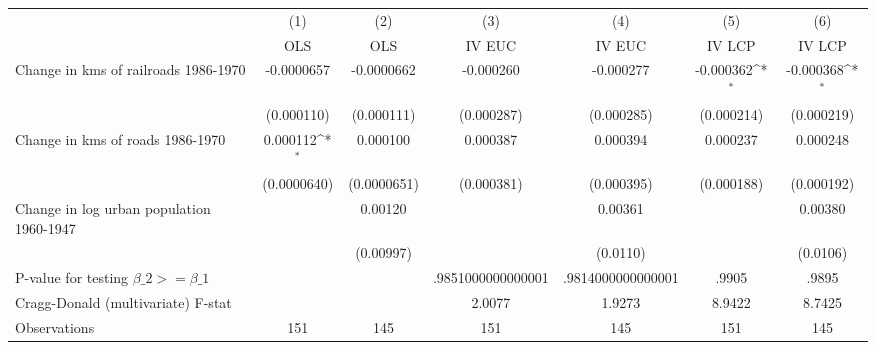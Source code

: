 {
\def\sym#1{\ifmmode^{#1}\else\(^{#1}\)\fi}
\begin{tabular}{l*{6}{c}}
\hline\hline
                &\multicolumn{1}{c}{(1)}&\multicolumn{1}{c}{(2)}&\multicolumn{1}{c}{(3)}&\multicolumn{1}{c}{(4)}&\multicolumn{1}{c}{(5)}&\multicolumn{1}{c}{(6)}\\
                &\multicolumn{1}{c}{OLS}&\multicolumn{1}{c}{OLS}&\multicolumn{1}{c}{IV EUC}&\multicolumn{1}{c}{IV EUC}&\multicolumn{1}{c}{IV LCP}&\multicolumn{1}{c}{IV LCP}\\
\hline
Change in kms of railroads 1986-1970&-0.0000657         &-0.0000662         &-0.000260         &-0.000277         &-0.000362\sym{*}  &-0.000368\sym{*}  \\
                &(0.000110)         &(0.000111)         &(0.000287)         &(0.000285)         &(0.000214)         &(0.000219)         \\
[1em]
Change in kms of roads 1986-1970& 0.000112\sym{*}  & 0.000100         & 0.000387         & 0.000394         & 0.000237         & 0.000248         \\
                &(0.0000640)         &(0.0000651)         &(0.000381)         &(0.000395)         &(0.000188)         &(0.000192)         \\
[1em]
Change in log urban population 1960-1947&                  &  0.00120         &                  &  0.00361         &                  &  0.00380         \\
                &                  &(0.00997)         &                  & (0.0110)         &                  & (0.0106)         \\
\hline
P-value for testing $\beta\_{2} >= \beta\_{1}$&                  &                  &.9851000000000001         &.9814000000000001         &    .9905         &    .9895         \\
Cragg-Donald (multivariate) F-stat&                  &                  &   2.0077         &   1.9273         &   8.9422         &   8.7425         \\
Observations    &      151         &      145         &      151         &      145         &      151         &      145         \\
\hline\hline
\end{tabular}
}
